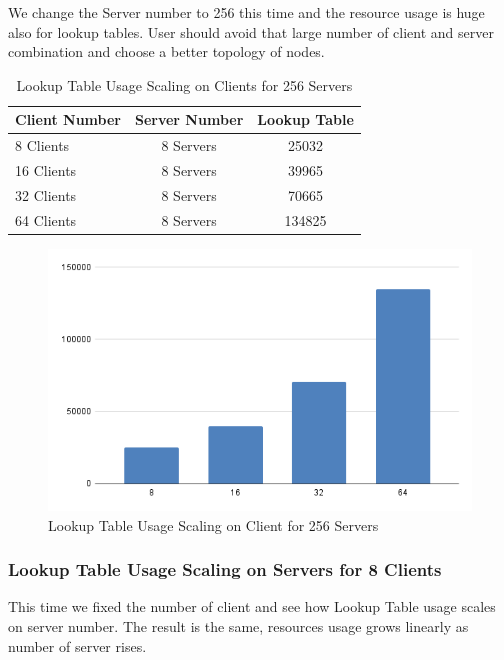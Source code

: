 We change the Server number to 256 this time and the resource usage is huge also for lookup tables. User should avoid that large number of client and server combination and choose a better topology of nodes. 

\begin{table}[htb]
	\centering
	\caption{Lookup Table Usage Scaling on Clients for 256 Servers}
	\begin{tabular}{l c c}
		\toprule
    	Client Number  & Server Number  & Lookup Table\\ \midrule
        8	Clients	&	8	Servers	&	25032	\\
        16	Clients	&	8	Servers	&	39965	\\
        32	Clients	&	8	Servers	&	70665	\\
        64	Clients	&	8	Servers	&	134825	\\
		\bottomrule
	\end{tabular}
	\label{tab:lut256s}
\end{table}

\begin{figure}[h]
	\centering
	\includegraphics[width=.9\linewidth]{figures/Scaling/LUTS256.png}
	\caption{Lookup Table Usage Scaling on Client for 256 Servers}
	\label{fig:luts256}
\end{figure}
\newpage
\subsubsection{Lookup Table Usage Scaling on Servers for 8 Clients}

This time we fixed the number of client and see how Lookup Table usage scales on server number. The result is the same, resources usage grows linearly as number of server rises.

